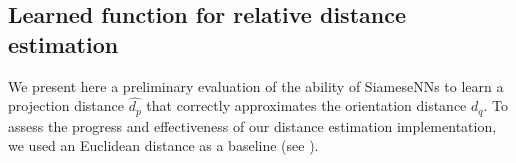 
\subsection{Learned function for relative distance estimation }\label{sec:results:distance-estimation:learned}


We present here a preliminary evaluation of the ability of SiameseNNs to learn a projection distance $\widehat{d_p}$ that correctly approximates the orientation distance $d_q$.
To assess the progress and effectiveness of our distance estimation implementation, we used an Euclidean distance as a baseline (see ).


